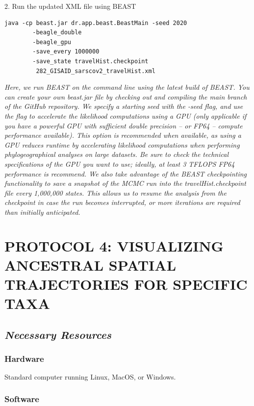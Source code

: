 \documentclass{article}
\newcommand{\ann}[1]{
\begin{adjustwidth}{0.5cm}{}
\it{#1}\\
\end{adjustwidth}}
\newcommand{\code}[1]{
{\upshape\ttfamily{#1}}}
\begin{document}
2. Run the updated XML file using BEAST
\begin{verbatim}
java -cp beast.jar dr.app.beast.BeastMain -seed 2020  
        -beagle_double	
        -beagle_gpu
        -save_every 1000000
        -save_state travelHist.checkpoint
         282_GISAID_sarscov2_travelHist.xml
\end{verbatim}

\ann{Here, we run BEAST on the command line using the latest build of BEAST. You can create your own beast.jar file by checking out and compiling the main branch of the \code{beast-mcmc} GitHub repository. We specify a starting seed with the -seed flag, and use the \code{-beagle\_cuda} flag %
to accelerate the likelihood computations using a GPU (only applicable if you have a powerful GPU with sufficient double precision -- or FP64 -- compute performance available).
This option is recommended when available, as using a GPU reduces runtime by accelerating likelihood computations when performing phylogeographical analyses on large datasets.
Be sure to check the technical specifications of the GPU you want to use; ideally, at least 3 TFLOPS FP64 performance is recommend.
We also take advantage of the BEAST checkpointing functionality \cite{onlineBEAST} to save a snapshot of the MCMC run into the travelHist.checkpoint file every 1,000,000 states.
This allows us to resume the analysis from the checkpoint in case the run becomes interrupted, or more iterations are required than initially anticipated.}


\section*{PROTOCOL 4: VISUALIZING ANCESTRAL SPATIAL TRAJECTORIES FOR SPECIFIC TAXA}
\subsection*{\textbf{\textit{Necessary Resources}}}
\subsubsection*{Hardware}
Standard computer running Linux, MacOS, or Windows. 

\subsubsection*{Software}
\end{document}
